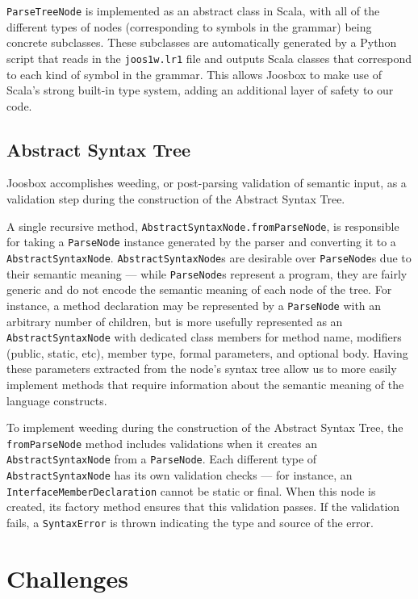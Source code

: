 \documentclass[letterpaper]{article}
\begin{document}
  {\tt ParseTreeNode} is implemented as an abstract class in Scala, with all
  of the different types of nodes (corresponding to symbols in the grammar)
  being concrete subclasses. These subclasses are automatically generated
  by a Python script that reads in the {\tt joos1w.lr1} file and outputs
  Scala classes that correspond to each kind of symbol in the grammar. This
  allows Joosbox to make use of Scala's strong built-in type system, adding
  an additional layer of safety to our code.

  \subsection{Abstract Syntax Tree}

  Joosbox accomplishes weeding, or post-parsing validation of semantic input,
  as a validation step during the construction of the Abstract Syntax Tree.

  A single recursive method, {\tt AbstractSyntaxNode.fromParseNode}, is
  responsible for taking a {\tt ParseNode} instance generated by the parser
  and converting it to a {\tt AbstractSyntaxNode}. {\tt AbstractSyntaxNode}s
  are desirable over {\tt ParseNode}s due to their semantic meaning --- while
  {\tt ParseNode}s represent a program, they are fairly generic and do not
  encode the semantic meaning of each node of the tree. For instance, a method
  declaration may be represented by a {\tt ParseNode} with an arbitrary number
  of children, but is more usefully represented as an {\tt AbstractSyntaxNode}
  with dedicated class members for method name, modifiers (public, static,
  etc), member type, formal parameters, and optional body. Having these
  parameters extracted from the node's syntax tree allow us to more easily
  implement methods that require information about the semantic meaning of the
  language constructs.

  To implement weeding during the construction of the Abstract Syntax Tree,
  the {\tt fromParseNode} method includes validations when it creates an {\tt
  AbstractSyntaxNode} from a {\tt ParseNode}. Each different type of {\tt
  AbstractSyntaxNode}  has its own validation checks --- for instance, an {\tt
  InterfaceMemberDeclaration} cannot be static  or final. When this node is
  created, its factory method ensures that this validation passes. If the
  validation  fails, a {\tt SyntaxError} is thrown indicating the type and
  source of the error.

  \section{Challenges}
\end{document}
